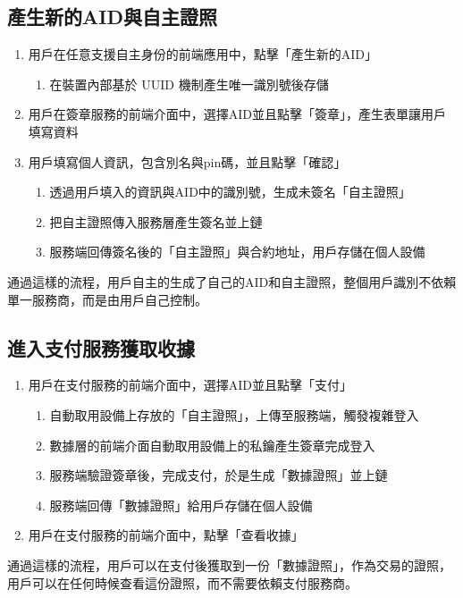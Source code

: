 \subsection{產生新的AID與自主證照}
\begin{enumerate}
  \item 用戶在任意支援自主身份的前端應用中，點擊「產生新的AID」
        \begin{enumerate}
          \item 在裝置內部基於 UUID 機制產生唯一識別號後存儲
        \end{enumerate}
  \item 用戶在簽章服務的前端介面中，選擇AID並且點擊「簽章」，產生表單讓用戶填寫資料
  \item 用戶填寫個人資訊，包含別名與pin碼，並且點擊「確認」
        \begin{enumerate}
          \item 透過用戶填入的資訊與AID中的識別號，生成未簽名「自主證照」
          \item 把自主證照傳入服務層產生簽名並上鏈
          \item 服務端回傳簽名後的「自主證照」與合約地址，用戶存儲在個人設備
        \end{enumerate}
\end{enumerate}
通過這樣的流程，用戶自主的生成了自己的AID和自主證照，整個用戶識別不依賴單一服務商，而是由用戶自己控制。
\subsection{進入支付服務獲取收據}
\begin{enumerate}
  \item 用戶在支付服務的前端介面中，選擇AID並且點擊「支付」
        \begin{enumerate}
          \item 自動取用設備上存放的「自主證照」，上傳至服務端，觸發複雜登入
          \item 數據層的前端介面自動取用設備上的私鑰產生簽章完成登入
          \item 服務端驗證簽章後，完成支付，於是生成「數據證照」並上鏈
          \item 服務端回傳「數據證照」給用戶存儲在個人設備
        \end{enumerate}
  \item 用戶在支付服務的前端介面中，點擊「查看收據」
\end{enumerate}
通過這樣的流程，用戶可以在支付後獲取到一份「數據證照」，作為交易的證照，用戶可以在任何時候查看這份證照，而不需要依賴支付服務商。
